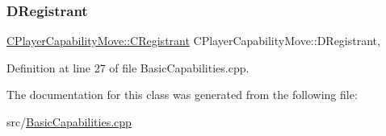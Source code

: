 \subsubsection{\texorpdfstring{D\+Registrant}{DRegistrant}}
{\footnotesize\ttfamily \hyperlink{classCPlayerCapabilityMove_1_1CRegistrant}{C\+Player\+Capability\+Move\+::\+C\+Registrant} C\+Player\+Capability\+Move\+::\+D\+Registrant\hspace{0.3cm}{\ttfamily [static]}, {\ttfamily [protected]}}



Definition at line 27 of file Basic\+Capabilities.\+cpp.



The documentation for this class was generated from the following file\+:\begin{DoxyCompactItemize}
\item 
src/\hyperlink{BasicCapabilities_8cpp}{Basic\+Capabilities.\+cpp}\end{DoxyCompactItemize}
